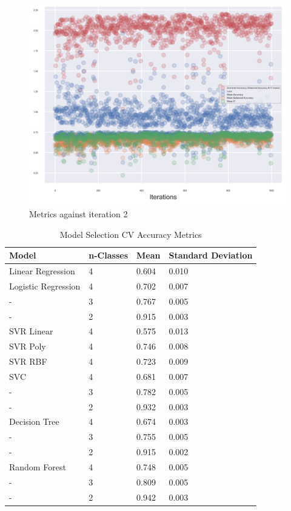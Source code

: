 \documentclass[11pt, a4paper]{article}
\begin{document}
\begin{multicols}{2}
\begin{figure}[H]
	\includegraphics[width=\linewidth]{Accuracy_against_iteration2.png} 
	\caption{Metrics against iteration 2}
	\label{fig:Acc2}
\end{figure}
\end{multicols}
\newpage

\begin{table}[t]
	\centering
	\begin{tabular}{|l|l|l|l|}
		\hline
		Model                 & n-Classes & Mean &Standard Deviation \\ \hline
		Linear Regression & 4 & 0.604 & 0.010 \\ \hline
		Logistic Regression & 4 & 0.702 & 0.007 \\ \hline
		- & 3 & 0.767 & 0.005 \\ \hline
		- & 2 & 0.915 & 0.003 \\ \hline
		SVR Linear & 4 & 0.575 & 0.013 \\ \hline
		SVR Poly & 4 & 0.746 & 0.008 \\ \hline
		SVR RBF & 4 & 0.723 & 0.009 \\ \hline
		SVC & 4 & 0.681 & 0.007 \\ \hline
		- & 3 & 0.782 & 0.005 \\ \hline
		- & 2 & 0.932 & 0.003 \\ \hline
		Decision Tree & 4 & 0.674 & 0.003 \\ \hline
		- & 3 & 0.755 & 0.005 \\ \hline
		- & 2 & 0.915 & 0.002 \\ \hline
		Random Forest & 4 & 0.748 & 0.005 \\ \hline
		- & 3 & 0.809 & 0.005 \\ \hline
		- & 2 & 0.942 & 0.003 \\ \hline
		\end{tabular}
	\caption{Model Selection CV Accuracy Metrics}
	\label{table:modelSelection}
\end{table}
\end{document}
